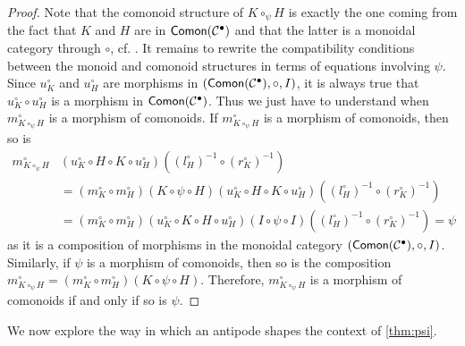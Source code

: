 \documentclass[nosumlimits,twoside]{amsart}
\theoremstyle{definition}
\theoremstyle{remark}
\def\Comon{{\sf Comon}}
\begin{document}
\begin{proof}
Note that the comonoid structure of $K\circ_{\psi} H$ is exactly the one coming from the fact that $K$ and $ H$ are in $\Comon (\mathcal{C}^\bullet)$ and that the latter is a monoidal category through $\circ$, cf. \cite[Proposition 6.35]{Aguiar}.
It remains to rewrite the compatibility conditions between the monoid and comonoid structures in terms of equations involving $\psi$. Since $u_K^\circ$ and $u_H^\circ$ are morphisms in $(\Comon (\mathcal{C}^\bullet),\circ,I)$, it is always true that $u_K^\circ\circ u_H^\circ$ is a morphism in  $\Comon (\mathcal{C}^\bullet)$. Thus we just have to understand when $m^\circ_{K\circ_\psi H}$ is a morphism of comonoids. If $m^\circ_{K\circ_\psi H}$ is a morphism of comonoids, then so is
\begin{align*}
m^\circ_{K\circ_\psi H}
&(u_K^\circ\circ H\circ K\circ u_H^\circ)((l_H^\circ)^{-1}\circ (r_K^\circ)^{-1})\\
&=(m^\circ_K\circ m^\circ_H)(K\circ\psi\circ H)(u_K^\circ\circ H\circ K\circ u_H^\circ)((l_H^\circ)^{-1}\circ (r_K^\circ)^{-1})
\\
&=(m^\circ_K\circ m^\circ_H)(u_K^\circ\circ {K}\circ  {H}\circ u_H^\circ)(I\circ\psi\circ I)((l_H^\circ)^{-1}\circ (r_K^\circ)^{-1})=\psi
\end{align*} as it is a composition of morphisms in the monoidal category $(\Comon (\mathcal{C}^\bullet),\circ, I)$.
Similarly, if $\psi$ is a morphism of comonoids, then so is the composition $m^\circ_{K\circ_\psi H}=(m^\circ_K\circ m^\circ_H)(K\circ\psi\circ H).$
Therefore, $m^\circ_{K\circ_\psi H}$ is a morphism of comonoids if and only if so is $\psi$.
\end{proof}

We now explore the way in which an antipode shapes the context of  \cref{thm:psi}.
\end{document}

